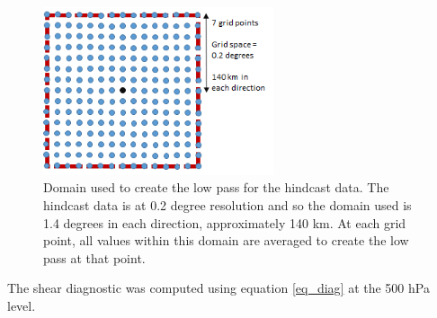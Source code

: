 \begin{figure}
	\centering	
	\includegraphics[width=16pc,angle=0]{low_pass.png}
	\caption{Domain used to create the low pass for the hindcast data.  The hindcast data is at 0.2 degree resolution and so the domain used is 1.4 degrees in each direction, approximately 140 km. At each grid point, all values within this domain are averaged to create the low pass at that point.}\label{fig:low_pass}
	\centering
\end{figure}

The shear diagnostic was computed using equation \ref{eq_diag} at the 500 hPa level.

%
%
%
%


